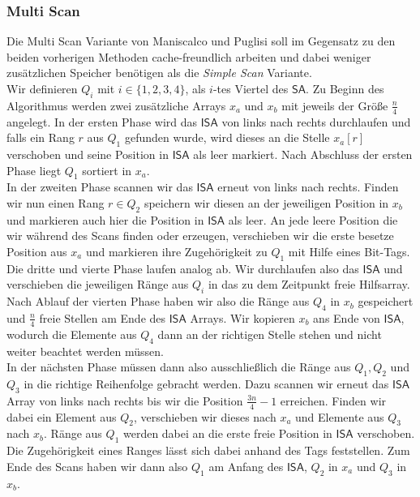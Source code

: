\subsubsection{Multi Scan}
Die Multi Scan Variante von Maniscalco und Puglisi \cite{saca:8} soll im Gegensatz zu den beiden vorherigen Methoden cache-freundlich arbeiten und dabei weniger zusätzlichen Speicher benötigen als die \textit{Simple Scan} Variante.\\
Wir definieren $Q_i$ mit $i \in \{1,2,3,4\}$, als $i$-tes Viertel des $\mathsf{SA}$. Zu Beginn des Algorithmus werden zwei zusätzliche Arrays $x_a$ und $x_b$ mit jeweils der Größe $\frac{n}{4}$ angelegt. In der ersten Phase wird das $\mathsf{ISA}$ von links nach rechts durchlaufen und falls ein Rang $r$ aus $Q_1$ gefunden wurde, wird dieses an die Stelle $x_a[r]$ verschoben und seine Position in $\mathsf{ISA}$ als leer markiert. Nach Abschluss der ersten Phase liegt $Q_1$ sortiert in $x_a$.\\
In der zweiten Phase scannen wir das $\mathsf{ISA}$ erneut von links nach rechts. Finden wir nun einen Rang $r \in Q_2$ speichern wir diesen an der jeweiligen Position in $x_b$ und markieren auch hier die Position in $\mathsf{ISA}$ als leer. An jede leere Position die wir während des Scans finden oder erzeugen, verschieben wir die erste besetze Position aus $x_a$ und markieren ihre Zugehörigkeit zu $Q_1$ mit Hilfe eines Bit-Tags. \\
Die dritte und vierte Phase laufen analog ab. Wir durchlaufen also das $\mathsf{ISA}$ und verschieben die jeweiligen Ränge aus $Q_i$ in das zu dem Zeitpunkt freie Hilfsarray. \\
Nach Ablauf der vierten Phase haben wir also die Ränge aus $Q_4$ in $x_b$ gespeichert und $\frac{n}{4}$ freie Stellen am Ende des $\mathsf{ISA}$ Arrays. Wir kopieren $x_b$ ans Ende von $\mathsf{ISA}$, wodurch die Elemente aus $Q_4$ dann an der richtigen Stelle stehen und nicht weiter beachtet werden müssen.\\
In der nächsten Phase müssen dann also ausschließlich die Ränge aus $Q_1,Q_2$ und $Q_3$ in die richtige Reihenfolge gebracht werden. Dazu scannen wir erneut das $\mathsf{ISA}$ Array von links nach rechts bis wir die Position $\frac{3n}{4}-1$ erreichen. Finden wir dabei ein Element aus $Q_2$, verschieben wir dieses nach $x_a$ und Elemente aus $Q_3$ nach $x_b$. Ränge aus $Q_1$ werden dabei an die erste freie Position in $\mathsf{ISA}$ verschoben. Die Zugehörigkeit eines Ranges lässt sich dabei anhand des Tags feststellen. Zum Ende des Scans haben wir dann also $Q_1$ am Anfang des $\mathsf{ISA}$, $Q_2$ in $x_a$ und $Q_3$ in $x_b$. \\
